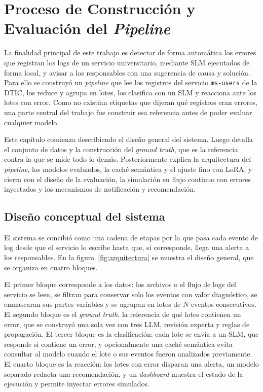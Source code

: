 \chapter{Proceso de Construcción y Evaluación del \textit{Pipeline}} \label{cap:metodologia}

La finalidad principal de este trabajo es detectar de forma automática los errores que registran los logs de un servicio universitario, mediante SLM ejecutados de forma local, y avisar a los responsables con una sugerencia de causa y solución. Para ello se construyó un \textit{pipeline} que lee los registros del servicio \texttt{ms-users} de la DTIC, los reduce y agrupa en lotes, los clasifica con un SLM y reacciona ante los lotes con error. Como no existían etiquetas que dijeran qué registros eran errores, una parte central del trabajo fue construir esa referencia antes de poder evaluar cualquier modelo.

Este capítulo comienza describiendo el diseño general del sistema. Luego detalla el conjunto de datos y la construcción del \textit{ground truth}, que es la referencia contra la que se mide todo lo demás. Posteriormente explica la arquitectura del \textit{pipeline}, los modelos evaluados, la caché semántica y el ajuste fino con LoRA, y cierra con el diseño de la evaluación, la simulación en flujo continuo con errores inyectados y los mecanismos de notificación y recomendación.

\section{Diseño conceptual del sistema}\label{sec:met_vision}

El sistema se concibió como una cadena de etapas por la que pasa cada evento de log desde que el servicio lo escribe hasta que, si corresponde, llega una alerta a los responsables. En la figura~\ref{fig:arquitectura} se muestra el diseño general, que se organiza en cuatro bloques.

El primer bloque corresponde a los datos: los archivos o el flujo de logs del servicio se leen, se filtran para conservar solo los eventos con valor diagnóstico, se enmascaran sus partes variables y se agrupan en lotes de $N$ eventos consecutivos. El segundo bloque es el \textit{ground truth}, la referencia de qué lotes contienen un error, que se construyó una sola vez con tres LLM, revisión experta y reglas de propagación. El tercer bloque es la clasificación: cada lote se envía a un SLM, que responde si contiene un error, y opcionalmente una caché semántica evita consultar al modelo cuando el lote o sus eventos fueron analizados previamente. El cuarto bloque es la reacción: los lotes con error disparan una alerta, un modelo separado redacta una recomendación, y un \textit{dashboard} muestra el estado de la ejecución y permite inyectar errores simulados.

